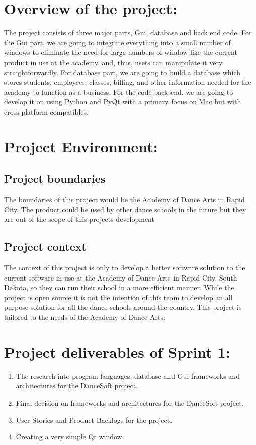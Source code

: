 \documentclass[11pt]{book}
\begin{document}
\section{Overview of the project:}
The project consists of three major parts, Gui, database and back end code. For the Gui part, we are going to integrate everything into a small number of windows to eliminate the need for large numbers of window like the current product in use at the academy. and, thus, users can manipulate it very straightforwardly. For database part, we are going to build a database which stores students, employees, classes, billing, and other information needed for the academy to function as a business. For the code back end, we are going to develop it on using Python and PyQt with a primary focus on Mac but with cross platform compatibles. 

\section{Project Environment:}

\subsection{Project boundaries}
The boundaries of this project would be the Academy of Dance Arts in Rapid City. The product could be used by other dance schools in the future but they are out of the scope of this projects development 

\subsection{Project context}
The context of this project is only to develop a better software solution to the current software in use at the Academy of Dance Arts in Rapid City, South Dakota, so they can run their school in a more efficient manner. While the project is open source it is not the intention of this team to develop an all purpose solution for all the dance schools around the country. This project is tailored to the needs of the Academy of Dance Arts.


\section{Project deliverables of Sprint 1:}

\begin{enumerate}
\item The research into program languages, database and Gui frameworks and architectures for the DanceSoft project.
\item Final decision on frameworks and architectures for the DanceSoft project.
\item User Stories and Product Backlogs for the project.
\item Creating a very simple Qt window.
\end{enumerate}
\end{document}
